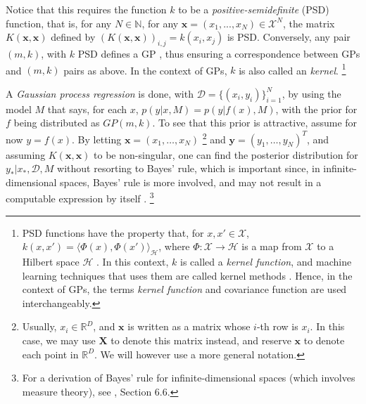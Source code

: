 Notice that this requires the function $k$ to be a \textit{positive-semidefinite} (PSD) function, that is, for any $N \in \mathbb{N}$, for any $\mathbf{x} = (x_1,...,x_N) \in \mathcal{X}^N$, the matrix $K(\mathbf{x},\mathbf{x})$ defined by $(K(\mathbf{x},\mathbf{x}))_{i,j} = k(x_i,x_j)$ is PSD. Conversely, any pair $(m,k)$, with $k$ PSD defines a GP \cite{Dudley_2002}, thus ensuring a correspondence between GPs and $(m,k)$ pairs as above. In the context of GPs, $k$ is also called an \textit{kernel}. \footnote{PSD functions have the property that, for $x,x' \in \mathcal{X}$, $k(x,x') = \langle \Phi(x), \Phi(x') \rangle_{\mathcal{H}}$, where $\Phi : \mathcal{X} \to \mathcal{H}$ is a map from $\mathcal{X}$ to a Hilbert space $\mathcal{H}$ \cite{Shawe_Taylor_2004}. In this context, $k$ is called a \textit{kernel function}, and machine learning techniques that uses them are called kernel methods \cite{Shawe_Taylor_2004}. Hence, in the context of GPs, the terms \textit{kernel function} and {covariance function} are used interchangeably.}

A \textit{Gaussian process regression} is done, with $\mathcal{D} = \{(x_i,y_i)\}_{i=1}^N$, by using the model $M$ that says, for each $x$, $p(y|x,M) = p(y|f(x),M)$, with the prior for $f$ being distributed as $GP(m,k)$. To see that this prior is attractive, assume for now $y = f(x)$. By letting $\mathbf{x} = (x_1,\ldots,x_N)$ \footnote{Usually, $x_i \in \mathbb{R}^D$, and $\mathbf{x}$ is written as a matrix whose $i$-th row is $x_i$. In this case, we may use $\mathbf{X}$ to denote this matrix instead, and reserve $\mathbf{x}$ to denote each point in $\mathbb{R}^D$. We will however use a more general notation.} and $\mathbf{y} = (y_1,\ldots,y_N)^T$, and assuming $K(\mathbf{x},\mathbf{x})$ to be non-singular, one can find the posterior distribution for $y_*|x_*,\mathcal{D},M$ without resorting to Bayes' rule, which is important since, in infinite-dimensional spaces, Bayes' rule is more involved, and may not result in a computable expression by itself \cite{Kanagawa_2018}. \footnote{For a derivation of Bayes' rule for infinite-dimensional spaces (which involves measure theory), see \cite{Stuart_2010}, Section 6.6.}

